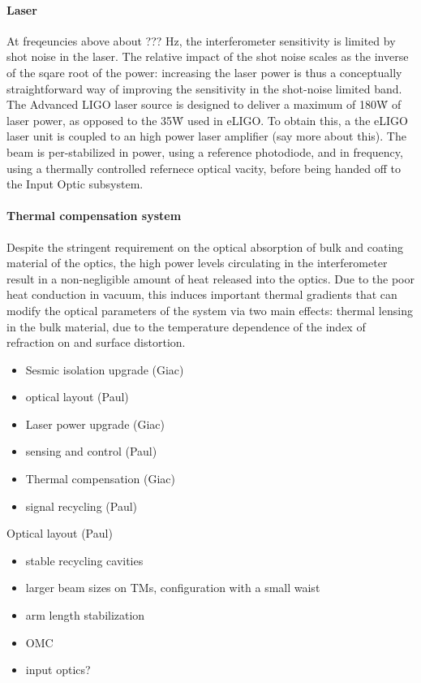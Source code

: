 \paragraph*{Laser}
At freqeuncies above about ??? Hz, the interferometer sensitivity is limited by shot noise in the laser. The relative impact of the shot noise scales as the inverse of the sqare root of the power: increasing the laser power is thus a conceptually straightforward way of improving the sensitivity in the shot-noise limited band. The Advanced LIGO laser source is designed to deliver a maximum of 180\.W of laser power, as opposed to the 35\.W used in eLIGO. To obtain this, a the eLIGO laser unit is coupled to an high power laser amplifier (say more about this). The beam is per-stabilized in power, using a reference photodiode, and in frequency, using a thermally controlled refernece optical vacity, before being handed off to the Input Optic subsystem.

\paragraph*{Thermal compensation system}
Despite the stringent requirement on the optical absorption of bulk and coating material of the optics, the high power levels circulating in the interferometer result in a non-negligible amount of heat released into the optics. Due to the poor heat conduction in vacuum, this induces important thermal gradients that can modify the optical parameters of the system via two main effects: thermal lensing in the bulk material, due to the temperature dependence of the index of refraction on  and surface distortion. 

\begin{itemize}
\item Sesmic isolation upgrade (Giac)
\item optical layout (Paul)
\item Laser power upgrade (Giac)
\item sensing and control (Paul)
\item Thermal compensation (Giac)
\item signal recycling (Paul)
\end{itemize}

Optical layout (Paul)

\begin{itemize}
\item stable recycling cavities
\item larger beam sizes on TMs, configuration with a small waist
\item arm length stabilization
\item OMC
\item input optics?
\end{itemize}

